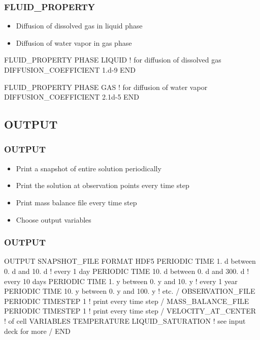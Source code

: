 \documentclass{beamer}
\newcommand\redcomment[1]{{{\color{red} #1}}}
\newcommand\bluecomment[1]{{{\color{blue} #1}}}
\begin{document}
\begin{frame}[fragile]\frametitle{FLUID\_PROPERTY}
\begin{itemize}
  \item Diffusion of dissolved gas in \redcomment{liquid phase}
  \item Diffusion of water vapor in \redcomment{gas phase}
\end{itemize}

\begin{semiverbatim}

FLUID_PROPERTY
  PHASE LIQUID \bluecomment{! for diffusion of dissolved gas}
  DIFFUSION_COEFFICIENT 1.d-9
END

FLUID_PROPERTY
  PHASE GAS \bluecomment{! for diffusion of water vapor}
  DIFFUSION_COEFFICIENT 2.1d-5
END
\end{semiverbatim}

\end{frame}

\subsection{OUTPUT}

\begin{frame}[fragile]\frametitle{OUTPUT}
\begin{itemize}
  \item Print a \redcomment{snapshot} of entire solution periodically
  \item Print the solution at \redcomment{observation points} every time step
  \item Print \redcomment{mass balance} file every time step
  \item Choose output \redcomment{variables}
\end{itemize}

\end{frame}

\begin{frame}[fragile]\frametitle{OUTPUT}

\begin{semiverbatim}\small
OUTPUT
  SNAPSHOT_FILE
    FORMAT HDF5
    PERIODIC TIME 1. d between 0. d and 10. d  \bluecomment{! every 1 day}
    PERIODIC TIME 10. d between 0. d and 300. d  \bluecomment{! every 10 days}
    PERIODIC TIME 1. y between 0. y and 10. y \bluecomment{! every 1 year}
    PERIODIC TIME 10. y between 0. y and 100. y \bluecomment{! etc.}
  /
  OBSERVATION_FILE
    PERIODIC TIMESTEP 1 \bluecomment{! print every time step}
  /
  MASS_BALANCE_FILE
    PERIODIC TIMESTEP 1 \bluecomment{! print every time step}
  /
  VELOCITY_AT_CENTER    \bluecomment{! of cell}
  VARIABLES
    TEMPERATURE
    LIQUID_SATURATION   \bluecomment{! see input deck for more}
  /
END
\end{semiverbatim}

\end{frame}
\end{document}
